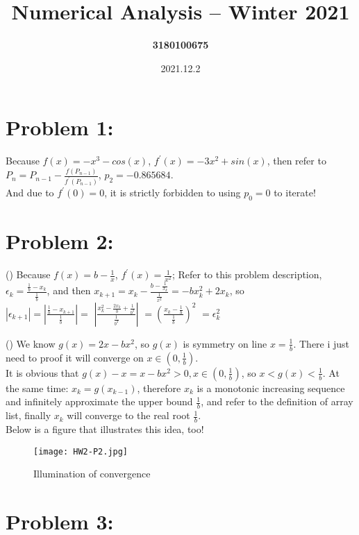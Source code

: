\documentclass{article}
\title{\textbf{Numerical Analysis – Winter 2021}}
\author{\textbf{3180100675}}
\date{2021.12.2}
\begin{document}
\maketitle

\section{Problem 1:}  

Because $f(x)=-x^{3}-cos(x)$, $f^{'}(x)=-3x^{2}+sin(x)$, then refer to $P_{n}=P_{n-1}-\frac{f(P_{n-1})}{f^{'}(P_{n-1})}$, $p_{2}=-0.865684$. \\
And due to $f^{'}(0)=0$, it is strictly forbidden to using $p_{0}=0$ to iterate!

\section{Problem 2:}
()
Because $f(x)=b-\frac{1}{x}$, $f^{'}(x)=\frac{1}{x^{2}}$;
Refer to this problem description, $\epsilon_{k}=\frac{\frac{1}{b}-x_{k}}{\frac{1}{b}}$, and then $x_{k+1}=x_{k}-\frac{b-\frac{1}{x_{k}}}{\frac{1}{x^2}}=-bx_{k}^{2}+2x_{k}$, so \\
$|\epsilon_{k+1}|=|\frac{\frac{1}{b}-x_{k+1}}{\frac{1}{b}}|=$
$|\frac{x_k^2-\frac{2x_k}{b}+\frac{1}{b^{2}}}{\frac{1}{b^2}}|$
$=(\frac{x_k-\frac{1}{b}}{\frac{1}{b}})^2$
$=\epsilon_k^2$

()
We know $g(x)=2x-bx^2$, so $g(x)$ is symmetry on line $x=\frac{1}{b}$. There i just need to proof it will converge on $x\in(0,\frac{1}{b})$. \\

It is obvious that $g(x)-x=x-bx^2>0, x\in(0,\frac{1}{b})$, so $x<g(x)<\frac{1}{b}$. At the same time: $x_k=g(x_{k-1})$, therefore ${x_k}$ is a monotonic increasing sequence and infinitely approximate the upper bound $\frac{1}{b}$, and refer to the definition of array list, finally $x_k$ will converge to the real root $\frac{1}{b}$. \\

Below is a figure that illustrates this idea, too!
\begin{figure}[htbp]
\centering
\texttt{[image: HW2-P2.jpg]}
\caption{Illumination of convergence}
\end{figure}

\section{Problem 3:}
\end{document}
